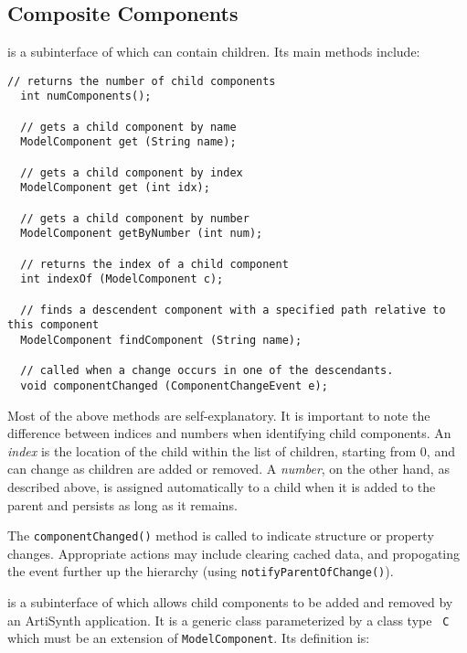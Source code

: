 \documentclass{article}
\begin{document}
\subsection{Composite Components}
\label{CompositeComponentSec}

 is a
subinterface of 
which can contain children. Its main methods include:

\begin{lstlisting}[]
  // returns the number of child components
  int numComponents();
 
  // gets a child component by name
  ModelComponent get (String name);

  // gets a child component by index
  ModelComponent get (int idx);

  // gets a child component by number
  ModelComponent getByNumber (int num);

  // returns the index of a child component
  int indexOf (ModelComponent c);

  // finds a descendent component with a specified path relative to this component
  ModelComponent findComponent (String name);

  // called when a change occurs in one of the descendants.
  void componentChanged (ComponentChangeEvent e);
\end{lstlisting}

Most of the above methods are self-explanatory. It is important to
note the difference between indices and numbers when identifying child
components. An {\it index} is the location of the child within the list of
children, starting from 0, and can change as children are added or
removed. A {\it number}, on the other hand, as described above, is
assigned automatically to a child when it is added to the parent and
persists as long as it remains.

The {\tt componentChanged()} method is called to indicate structure or
property changes. Appropriate actions may include clearing cached
data, and propogating the event further up the hierarchy (using
{\tt notifyParentOfChange()}).

 is a
subinterface of
 which allows
child components to be added and removed by an ArtiSynth
application. It is a generic class parameterized by a class type {\tt
C} which must be an extension of {\tt ModelComponent}. Its definition
is:
\end{document}
